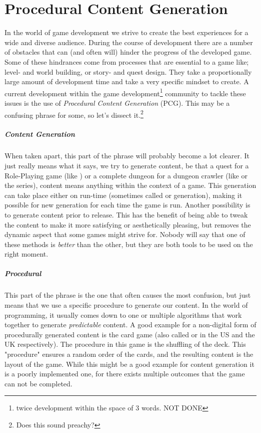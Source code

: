 \chapter{Procedural Content Generation}
In the world of game development we strive to create the best experiences for a wide and diverse audience.
During the course of development there are a number of obstacles that can (and often will) hinder the progress of the developed game.
Some of these hindrances come from processes that are essential to a game like; level- and world building, or story- and quest design.
They take a proportionally large amount of development time and take a very specific mindset to create.
A current development within the game development\footnote{twice development within the space of 3 words.
NOT DONE} community to tackle these issues is the use of \textit{Procedural Content Generation} (PCG).
This may be a confusing phrase for some, so let's dissect it.\footnote{Does this sound preachy?}
\paragraph{Content Generation} When taken apart, this part of the phrase will probably become a lot clearer.
It just really means what it says, we try to generate content, be that a quest for a Role-Playing game (like ) or a complete dungeon for a dungeon crawler (like  or the  series), content means anything within the context of a game.
This generation can take place either on run-time (sometimes called  or  generation), making it possible for new generation for each time the game is run.
Another possibility is to generate content prior to release.
This has the benefit of being able to tweak the content to make it more satisfying or aesthetically pleasing, but removes the dynamic aspect that some games might strive for.
Nobody will say that one of these methods is \emph{better} than the other, but they are both tools to be used on the right moment.
\paragraph{Procedural} This part of the phrase is the one that often causes the most confusion, but just means that we use a specific procedure to generate our content.
In the world of programming, it usually comes down to one or multiple algorithms that work together to generate \emph{predictable} content.
A good example for a non-digital form of procedurally generated content is the card game  (also called  or  in the US and the UK respectively).
The procedure in this game is the shuffling of the deck.
This "procedure" ensures a random order of the cards, and the resulting content is the layout of the game.
While this might be a good example for content generation it is a poorly implemented one, for there exists multiple outcomes that the game can not be completed.
